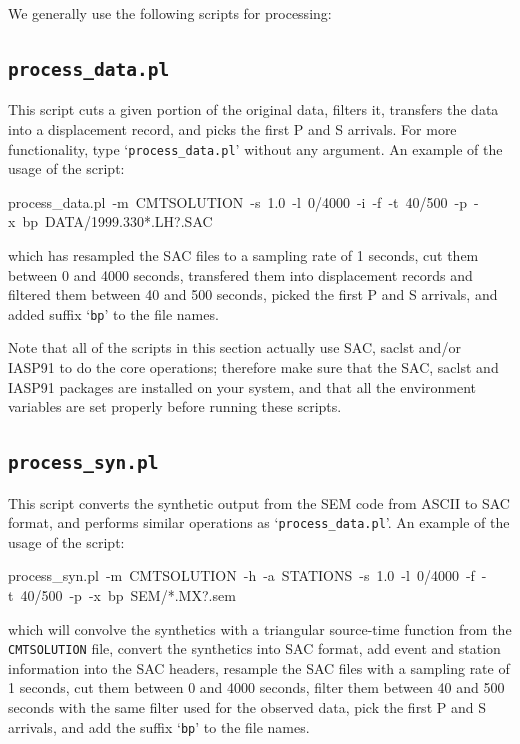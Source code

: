 \documentclass[oneside,english]{book}
\newenvironment{lyxcode}
{\begin{list}{}{
\setlength{\rightmargin}{\leftmargin}
\setlength{\listparindent}{0pt}%
\raggedright
\setlength{\itemsep}{0pt}
\setlength{\parsep}{0pt}
\normalfont\ttfamily}%
 \item[]}
{\end{list}}
\begin{document}
We generally use the following scripts for processing:

\subsection{\texttt{process\_data.pl}}

This script cuts a given portion of the original data, filters it,
transfers the data into a displacement record, and picks the first
P and S arrivals. For more functionality, type `\texttt{process\_data.pl}'
without any argument. An example of the usage of the script:

\begin{lyxcode}
{\footnotesize process\_data.pl~-m~CMTSOLUTION~-s~1.0~-l~0/4000~-i~-f~-t~40/500~-p~-x~bp~DATA/1999.330{*}.LH?.SAC}{\footnotesize \par}
\end{lyxcode}

\noindent which has resampled the SAC files to a sampling rate of 1 seconds, cut them between 0 and 4000 seconds, transfered them into displacement
records and filtered them between 40 and 500 seconds, picked the first P and S arrivals, and added suffix `\texttt{bp}' to the file names.

Note that all of the scripts in this section actually use SAC,
saclst and/or IASP91 to do the core operations; therefore make sure
that the SAC, saclst and IASP91 packages are installed on your
system, and that all the environment variables are set properly before
running these scripts.


\subsection{\texttt{\label{sub:process_syn.pl}process\_syn.pl}}

This script converts the synthetic output from the SEM code from ASCII
to SAC format, and performs similar operations as `\texttt{process\_data.pl}'.
An example of the usage of the script:

\begin{lyxcode}
{\footnotesize process\_syn.pl~-m~CMTSOLUTION~-h~-a~STATIONS~-s~1.0~-l~0/4000~-f~-t~40/500~-p~-x~bp~SEM/{*}.MX?.sem}{\footnotesize \par}
\end{lyxcode}
which will convolve the synthetics with a triangular source-time function
from the \texttt{CMTSOLUTION} file, convert the synthetics into SAC
format, add event and station information into the SAC headers, resample the SAC files with a sampling rate of 1 seconds, cut them between 0 and 4000 seconds, filter them between 40 and
500 seconds with the same filter used for the observed data, pick the first P and S arrivals, and add the suffix `\texttt{bp}'
to the file names.
\end{document}
